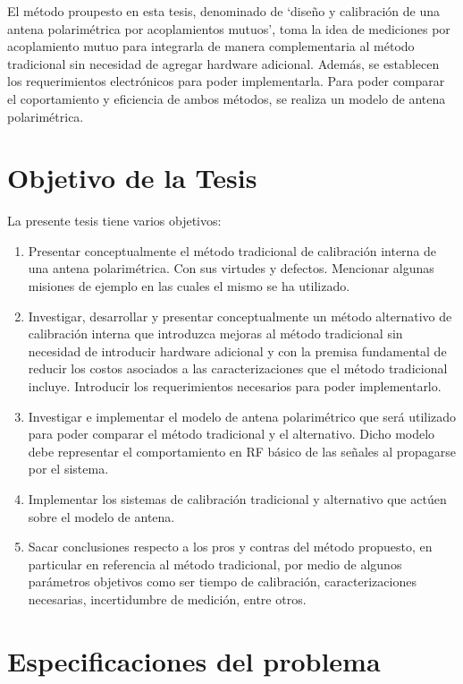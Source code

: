 El método proupesto en esta tesis, denominado de \enquote*{diseño y calibración de una antena polarimétrica por 
acoplamientos mutuos}, toma la idea de mediciones por acoplamiento mutuo \cite{Agrawal2003}\cite{Shipley2000} \cite{Aumann1989}
\cite{Chen2012} para integrarla de manera complementaria al método tradicional sin necesidad de agregar hardware adicional. 
Además, se establecen los requerimientos electrónicos para poder implementarla. Para poder comparar el coportamiento y 
eficiencia de ambos métodos, se realiza un modelo de antena polarimétrica.

\section{Objetivo de la Tesis} \label{sc:objective}

La presente tesis tiene varios objetivos:

\begin{enumerate}
    \item Presentar conceptualmente el método tradicional de calibración interna de una antena polarimétrica. Con sus 
		virtudes y defectos. Mencionar algunas misiones de ejemplo en las cuales el mismo se ha utilizado.
    \item Investigar, desarrollar y presentar conceptualmente un método alternativo de calibración interna que introduzca
		mejoras al método tradicional sin necesidad de introducir hardware adicional y con la premisa fundamental de
		reducir los costos asociados a las caracterizaciones que el método tradicional incluye. Introducir los
		requerimientos necesarios para poder implementarlo.
    \item Investigar e implementar el modelo de antena polarimétrico que será utilizado para poder comparar el 
		método tradicional y el alternativo. Dicho modelo debe representar el comportamiento en RF básico de las señales al 
		propagarse por el sistema.
    \item Implementar los sistemas de calibración tradicional y alternativo que actúen sobre el modelo de antena. 
    \item Sacar conclusiones respecto a los pros y contras del método propuesto, en particular en referencia al método
		tradicional, por medio de algunos parámetros objetivos como ser tiempo de calibración, caracterizaciones necesarias,
		incertidumbre de medición, entre otros.
\end{enumerate}


\section{Especificaciones del problema} \label{sc:specifications}

